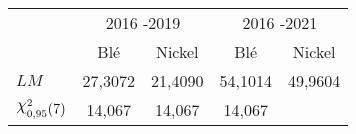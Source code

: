 \begin{tabular}{lcccc}
    \toprule
         & \multicolumn{2}{c}{2016 -2019} & \multicolumn{2}{c}{2016 -2021}  \\
         & Blé      & Nickel    & Blé       & Nickel                        \\
    \cmidrule(r){1-1}\cmidrule(lr){2-3}\cmidrule(l){4-5}                    
        $LM$ & 27,3072 & 21,4090 & 54,1014 & 49,9604                        \\
        $\rchi^{2}_{0,95} (7)$ & 14,067& 14,067& 14,067                     \\
    \bottomrule
\end{tabular}